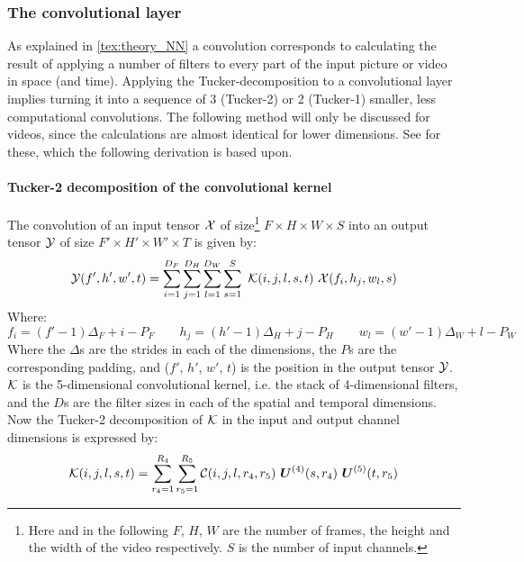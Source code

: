 \subsubsection{The convolutional layer}
As explained in \autoref{tex:theory_NN} a convolution corresponds to calculating the result of applying a number of filters to every part of the input picture or video in space (and time). Applying the Tucker-decomposition to a convolutional layer implies turning it into a sequence of 3 (Tucker-2) or 2 (Tucker-1) smaller, less computational convolutions. The following method will only be discussed for videos, since the calculations are almost identical for lower dimensions. See \cite{Kim2016} for these, which the following derivation is based upon.

\paragraph{Tucker-2 decomposition of the convolutional kernel}
The convolution of an input tensor $\mathcal{X}$ of size\footnote{Here and in the following $F$, $H$, $W$ are the number of frames, the height and the width of the video respectively. $S$ is the number of input channels.} $F\times H \times W \times S$ into an output tensor $\mathcal{Y}$ of size $F'\times H' \times W' \times T$ is given by:
\begin{equation}
    \tensor{Y}(f', h', w', t) = \sum_{i=1}^{D_F} \sum_{j=1}^{D_H} \sum_{l=1}^{D_W} \sum_{s=1}^{S} \ \tensor{K}(i, j, l, s, t) \ \tensor{X}(f_i, h_j, w_l, s)
    \label{eq:3d_convolution}
\end{equation}
Where:
\begin{equation}
    f_i = \left(f' - 1\right) \Delta_F + i - P_F \qquad h_j =  \left(h' - 1\right) \Delta_H + j - P_H \qquad w_l =  \left(w' - 1\right) \Delta_W + l - P_W
\end{equation}
Where the $\Delta$s are the strides in each of the dimensions, the $P$s are the corresponding padding, and ($f'$, $h'$, $w'$, $t$) is the position in the output tensor $\mathcal{Y}$. $\mathcal{K}$ is the 5-dimensional convolutional kernel, i.e. the stack of 4-dimensional filters, and the $D$s are the filter sizes in each of the spatial and temporal dimensions. Now the Tucker-2 decomposition of $\mathcal{K}$ in the input and output channel dimensions is expressed by:
\begin{equation}
\mathcal{K}(i, j, l, s, t)=\sum_{r_{4}=1}^{R_{4}} \sum_{r_{5}=1}^{R_{5}} \mathcal{C}(i, j, l, r_{4}, r_{5}) \ \boldsymbol{U}^{(4)}(s, r_{4}) \  \boldsymbol{U}^{(5)}(t, r_{5})
\end{equation}
